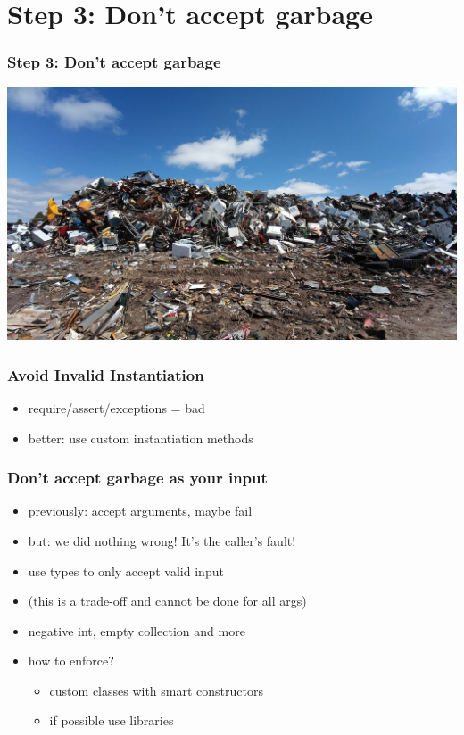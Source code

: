 \documentclass{beamer}
\begin{document}
\section{Step 3: Don't accept garbage}

\begin{frame}
  \frametitle{Step 3: Don't accept garbage}
  \includegraphics[width=\textwidth]{../pics/scrapyard-2441432_1280.jpg}
\end{frame}

\begin{frame}
  \frametitle{Avoid Invalid Instantiation}
  \begin{itemize}
  \item require/assert/exceptions = bad
  \item better: use custom instantiation methods
  \end{itemize}
\end{frame}

\begin{frame}
  \frametitle{Don't accept garbage as your input}
   \begin{itemize}
  \item previously: accept arguments, maybe fail
  \item but: we did nothing wrong!  It's the caller's fault!
  \item use types to only accept valid input
  \item (this is a trade-off and cannot be done for all args)
  \item negative int, empty collection and more
  \item how to enforce?
    \begin{itemize}
    \item custom classes with smart constructors
    \item if possible use libraries
    \end{itemize}
  \end{itemize}
\end{frame}
\end{document}
